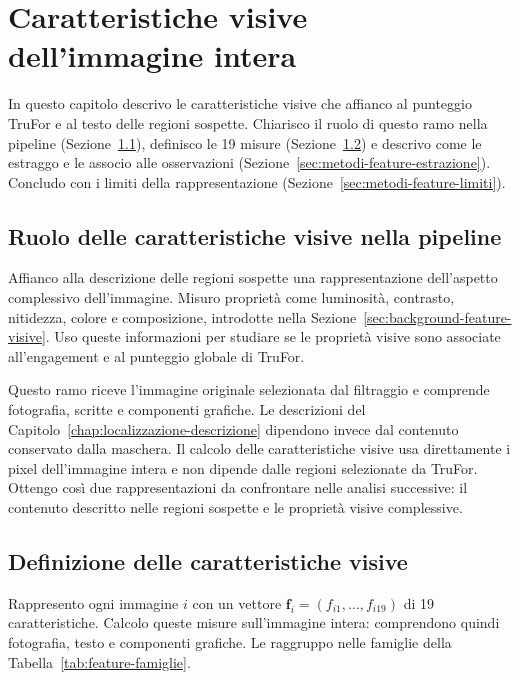 
\chapter{Caratteristiche visive dell'immagine intera}
\label{chap:caratteristiche-visive}

In questo capitolo descrivo le caratteristiche visive che affianco al punteggio TruFor e al testo delle regioni sospette. Chiarisco il ruolo di questo ramo nella pipeline (Sezione~\ref{sec:feature-ruolo}), definisco le 19 misure (Sezione~\ref{sec:materiali-feature-visive}) e descrivo come le estraggo e le associo alle osservazioni (Sezione~\ref{sec:metodi-feature-estrazione}). Concludo con i limiti della rappresentazione (Sezione~\ref{sec:metodi-feature-limiti}).

\section{Ruolo delle caratteristiche visive nella pipeline}
\label{sec:feature-ruolo}

Affianco alla descrizione delle regioni sospette una rappresentazione dell'aspetto complessivo dell'immagine. Misuro proprietà come luminosità, contrasto, nitidezza, colore e composizione, introdotte nella Sezione~\ref{sec:background-feature-visive}. Uso queste informazioni per studiare se le proprietà visive sono associate all'engagement e al punteggio globale di TruFor.

Questo ramo riceve l'immagine originale selezionata dal filtraggio e comprende fotografia, scritte e componenti grafiche. Le descrizioni del Capitolo~\ref{chap:localizzazione-descrizione} dipendono invece dal contenuto conservato dalla maschera. Il calcolo delle caratteristiche visive usa direttamente i pixel dell'immagine intera e non dipende dalle regioni selezionate da TruFor. Ottengo così due rappresentazioni da confrontare nelle analisi successive: il contenuto descritto nelle regioni sospette e le proprietà visive complessive.

\section{Definizione delle caratteristiche visive}
\label{sec:materiali-feature-visive}

Rappresento ogni immagine $i$ con un vettore $\mathbf{f}_i=(f_{i1},\ldots,f_{i19})$ di 19 caratteristiche. Calcolo queste misure sull'immagine intera: comprendono quindi fotografia, testo e componenti grafiche. Le raggruppo nelle famiglie della Tabella~\ref{tab:feature-famiglie}.

